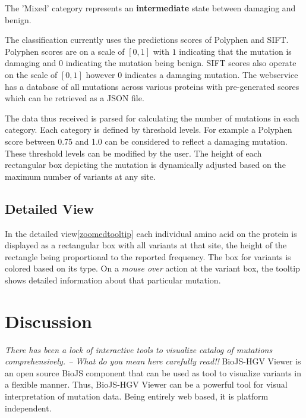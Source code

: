 \documentclass[twoside]{article}
\begin{document}
\begin{multicols}{2}
The 'Mixed' category represents an \textbf{intermediate} state between damaging and benign.


The classification currently uses the predictions scores of Polyphen\cite{Ramensky2002} and SIFT\cite{Kumar2009}. Polyphen scores are on a scale of $[0,1]$ with $1$ indicating that the mutation is damaging and $0$ indicating the mutation being benign. SIFT scores also operate on the scale of $[0,1]$ however $0$ indicates a damaging mutation.
The webservice has a database of all mutations across various proteins with pre-generated scores which can be retrieved as a JSON file.

The data thus received is parsed for calculating the number of mutations in each category. Each category is defined by threshold levels. For example a Polyphen score between 0.75 and 1.0 can be considered to reflect a damaging mutation. These threshold levels can be modified by the user. The height of each rectangular box depicting the mutation is dynamically adjusted based on the maximum number of variants at any site.


\subsection{Detailed View}
In the detailed view\ref{zoomedtooltip} each individual amino acid on the protein is displayed as a rectangular box with all variants at that site, the height of the rectangle being proportional to the reported frequency. The box for variants is colored based on its type. On a \textit{mouse over} action at the variant box, the tooltip shows detailed information about that particular mutation.


\section{Discussion}
\textit{There has been a lock of interactive tools to visualize catalog of mutations comprehensively. -- What do you mean here carefully read!!} BioJS-HGV Viewer is an open source BioJS component that can be used as tool to visualize variants in a flexible manner. Thus, BioJS-HGV Viewer can be a powerful tool for visual interpretation of mutation data. Being entirely web based, it is platform independent.



\end{multicols}
\end{document}
